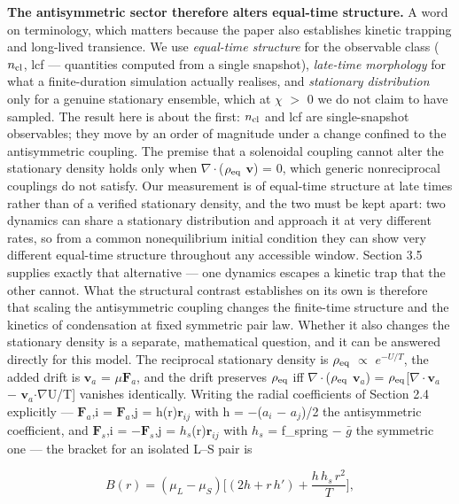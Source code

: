\documentclass[aps,pre,preprint,superscriptaddress,nofootinbib,longbibliography]{revtex4-2}
\begin{document}
\textbf{The antisymmetric sector therefore alters equal-time structure.} A word on terminology, which matters because the paper also establishes kinetic trapping and long-lived transience. We use \emph{equal-time structure} for the observable class ($n_{\rm cl}$, lcf --- quantities computed from a single snapshot), \emph{late-time morphology} for what a finite-duration simulation actually realises, and \emph{stationary distribution} only for a genuine stationary ensemble, which at $\chi$ $>$ 0 we do not claim to have sampled. The result here is about the first: $n_{\rm cl}$ and lcf are single-snapshot observables; they move by an order of magnitude under a change confined to the antisymmetric coupling. The premise that a solenoidal coupling cannot alter the stationary density holds only when $\nabla \cdot$($\rho_{\rm eq}$ $\mathbf{v}$) = 0, which generic nonreciprocal couplings do not satisfy. Our measurement is of equal-time structure at late times rather than of a verified stationary density, and the two must be kept apart: two dynamics can share a stationary distribution and approach it at very different rates, so from a common nonequilibrium initial condition they can show very different equal-time structure throughout any accessible window. Section 3.5 supplies exactly that alternative --- one dynamics escapes a kinetic trap that the other cannot. What the structural contrast establishes on its own is therefore that scaling the antisymmetric coupling changes the finite-time structure and the kinetics of condensation at fixed symmetric pair law. Whether it also changes the stationary density is a separate, mathematical question, and it can be answered directly for this model. The reciprocal stationary density is $\rho_{\rm eq}$ $\propto$ $e^{-U/T}$, the added drift is $\mathbf{v}_{a}$ = $\mu$$\mathbf{F}_{a}$, and the drift preserves $\rho_{\rm eq}$ iff $\nabla \cdot$($\rho_{\rm eq}$ $\mathbf{v}_{a}$) = $\rho_{\rm eq}$[$\nabla \cdot$$\mathbf{v}_{a}$ $-$ $\mathbf{v}_{a}$$\cdot \nabla$U/T] vanishes identically. Writing the radial coefficients of Section 2.4 explicitly --- $\mathbf{F}_{a}$,i = $\mathbf{F}_{a}$,j = h(r)$\mathbf{r}_{ij}$ with h = $-$($a_{i}$ $-$ $a_{j}$)/2 the antisymmetric coefficient, and $\mathbf{F}_{s}$,i = $-$$\mathbf{F}_{s}$,j = $h_{s}$(r)$\mathbf{r}_{ij}$ with $h_{s}$ = f\_spring $-$ $\bar{g}$ the symmetric one --- the bracket for an isolated L--S pair is

\begin{equation}
B(r)=(\mu_L-\mu_S)\Big[(2h+r\,h')+\frac{h\,h_s\,r^{2}}{T}\Big],
\end{equation}
\end{document}
